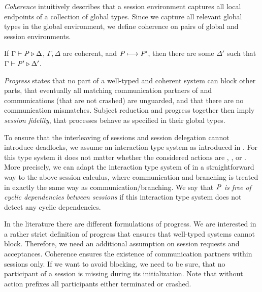 \emph{Coherence} intuitively describes that a session environment captures all local endpoints of a collection of global types.
Since we capture all relevant global types in the global environment, we define
coherence on pairs of global and session environments.

\begin{theorem}
	\label{thm:subjectReduction}
	If $ \Gamma \vdash \mathit{P} \triangleright \Delta $, $ \Gamma, \Delta $ are coherent, and $ \mathit{P} \longmapsto \mathit{P}' $, then there are some $ \Delta' $ such that $ \Gamma \vdash \mathit{P}' \triangleright \Delta' $.
\end{theorem}

\emph{Progress} states that no part of a well-typed and coherent system can block other parts, that eventually all matching communication partners of \strongR and \weakR communications (that are not crashed) are unguarded, and that there are no communication mismatches.
Subject reduction and progress together then imply \emph{session fidelity}, \ie that processes behave as specified in their global types.

To ensure that the interleaving of sessions and session delegation cannot introduce deadlocks, we assume an interaction type system as introduced in \cite{BettiniEtal08,hondaYoshidaCarbone16}.
For this type system it does not matter whether the considered actions are \strongR, \weakR, or \unrel.
More precisely, we can adapt the interaction type system of \cite{BettiniEtal08} in a straightforward way to the above session calculus, where \unrel communication and \weakR branching is treated in exactly the same way as \strongR communication/branching.
We say that \emph{$ \mathit{P} $ is free of cyclic dependencies between sessions} if this interaction type system does not detect any cyclic dependencies.

In the literature there are different formulations of progress.
We are interested in a rather strict definition of progress that ensures that well-typed systems cannot block.
Therefore, we need an additional assumption on session requests and acceptances.
Coherence ensures the existence of communication partners within sessions only.
If we want to avoid blocking, we need to be sure, that no participant of a session is missing during its initialization.
Note that without action prefixes all participants either terminated or crashed.

